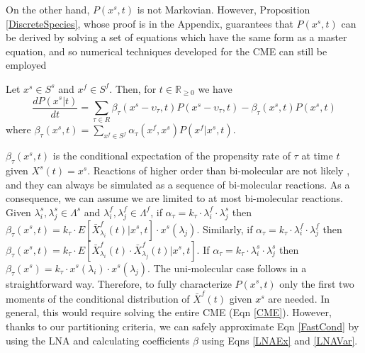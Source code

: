 \documentclass{llncs}
\begin{document}
On the other hand, $P(x^s,t)$ is not Markovian. However, Proposition \ref{DiscreteSpecies}, whose proof is in the Appendix, guarantees that $P(x^s,t)$ can be derived by solving a set of equations which have the same form as a master equation, and so numerical techniques developed for the CME can still be employed
\begin{proposition}\label{DiscreteSpecies}
Let $x^s \in S^s$ and $x^f \in S^f$. Then, for $t \in \mathbb{R}_{\geq 0}$ we have
\begin{equation}\label{DIscreteSpecies}
\frac{d P(x^s|t)}{dt}=\sum_{\tau \in R}\beta_{\tau}(x^s-\upsilon_{\tau},t)P(x^s-\upsilon_{\tau},t)- \beta_{\tau}(x^s,t)P(x^s,t)
\end{equation}
where $\beta_{\tau}(x^s,t)= \sum_{x^f \in S^f} \alpha_{\tau}(x^f,x^s)P(x^f|x^s,t)$. 
\end{proposition}
$\beta_{\tau}(x^s,t)$ is the conditional expectation of the propensity rate of $\tau$ at time $t$ given $X^s(t)=x^s$.
 Reactions of higher order than bi-molecular are not likely \cite{cardelli2008process}, and they can always be simulated as a sequence of bi-molecular reactions. As a consequence, we can assume we are limited to at most bi-molecular reactions. Given $\lambda^s_i,\lambda^s_j \in \Lambda^s$ and $\lambda^f_i,\lambda^f_j \in \Lambda^f$, if $\alpha_{\tau}=k_\tau\cdot \lambda_i^f\cdot \lambda_j^{s}$ then 
$ \beta_{\tau}(x^s,t)=  %
k_{\tau}\cdot E[\bar{X}^f_{\lambda_i}(t)|x^s,t]\cdot x^s(\lambda_j).$
Similarly, if $\alpha_{\tau}=k_\tau \cdot \lambda_i^f\cdot  \lambda_j^{f}$ then 
$ \beta_{\tau}(x^s,t)=  %
k_{\tau} \cdot E[\bar{X}^f_{\lambda_i}(t)\cdot \bar{X}^f_{\lambda_j}(t)|x^s,t].                      $
If $\alpha_{\tau}=k_\tau \cdot \lambda_i^s \cdot \lambda_j^{s}$ then  $\beta_{\tau}(x^s)=k_{\tau}\cdot x^s(\lambda_i) \cdot x^s(\lambda_j)$. The uni-molecular case follows in a straightforward way.
Therefore, to fully characterize $P(x^s,t)$ only the first two moments of the conditional distribution of $\bar{X}^f(t)$ given $x^s$ are needed.
In general, this would require solving the entire CME (Eqn \eqref{CME}). However, thanks to our partitioning criteria, we can safely approximate Eqn \eqref{FastCond} by using the LNA and calculating  coefficients $\beta$ using Eqns \eqref{LNAEx} and \eqref{LNAVar}.
\end{document}
